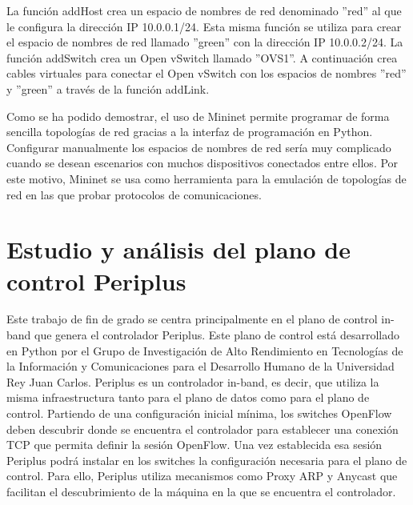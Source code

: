 \documentclass[a4paper, 12pt]{book}
\begin{document}
	La función addHost crea un espacio de nombres de red denominado ''red'' al que le configura
	la dirección IP 10.0.0.1/24. Esta misma función se utiliza para crear el espacio de nombres de
	red llamado ''green'' con la dirección IP 10.0.0.2/24.
	La función addSwitch crea un Open vSwitch llamado ''OVS1''. A continuación crea cables virtuales
	para conectar el Open vSwitch con los espacios de nombres ''red'' y ''green'' a través de la función
	addLink.
	
	Como se ha podido demostrar, el uso de Mininet permite programar de forma sencilla
	topologías de red gracias a la interfaz de programación en Python. Configurar manualmente
	los espacios de nombres de red sería muy complicado cuando se desean escenarios con
	muchos dispositivos conectados entre ellos. Por este motivo, Mininet se usa como herramienta
	para la emulación de topologías de red en las que probar protocolos de comunicaciones.
	
	
	
	\cleardoublepage %
	\chapter{Estudio y análisis del plano de control Periplus} %
	\label{chap:periplus} %
	
	Este trabajo de fin de grado se centra principalmente en el plano de control in-band que genera el controlador Periplus. Este plano de control está desarrollado en Python por el Grupo de Investigación de Alto Rendimiento en Tecnologías de la Información y Comunicaciones para el Desarrollo Humano de la Universidad Rey Juan Carlos. Periplus es un controlador in-band, es decir, que utiliza la misma infraestructura tanto para el plano de datos como para el plano de control. Partiendo de una configuración inicial mínima, los switches OpenFlow deben descubrir donde
	se encuentra el controlador para establecer una conexión TCP que permita definir la sesión
	OpenFlow. Una vez establecida esa sesión Periplus podrá instalar en los switches la configuración
	necesaria para el plano de control.	Para ello, Periplus utiliza mecanismos como Proxy ARP y Anycast que facilitan el descubrimiento de la máquina en la que se encuentra el controlador.
	
\end{document}
